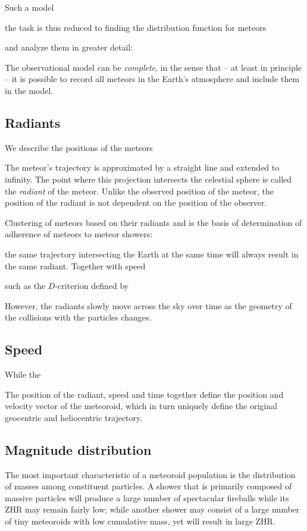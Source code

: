     Such a model 

    the task is thus reduced to finding the distribution function for meteors

    and analyze them in greater detail:

    The observational model can be \emph{complete}, in the sense that -- at least in principle -- it
    is possible to record all meteors in the Earth's atmosphere and include them in the model.

    \subsection{Radiants} \label{msr}        
        We describe the positions of the meteors

        The meteor's trajectory is approximated by a straight line and extended to infinity.
        The point where this projection intersects the celestial sphere is called the \emph{radiant} of the meteor.
        Unlike the observed position of the meteor, the position of the radiant is not dependent on
        the position of the observer.

        Clustering of meteors based on their radiants and is the basis of determination of
        adherence of meteors to meteor showers:

        the same trajectory intersecting the Earth at the same time will always result
        in the same radiant. Together with speed 

        such as the $D$-criterion defined by \citep{southworth+1964}

        However, the radiants slowly move across the sky over time as the geometry of the collisions
        with the particles changes.

    \subsection{Speed} \label{mss}
        While the 

        The position of the radiant, speed and time together define the position and velocity vector of the meteoroid,
        which in turn uniquely define the original geocentric and heliocentric trajectory.

    \subsection{Magnitude distribution} \label{msm}
        The most important characteristic of a meteoroid population is the distribution of masses
        among constituent particles. A shower that is primarily composed of massive particles
        will produce a large number of spectacular fireballs while its ZHR may remain fairly low;
        while another shower may consist of a large number of tiny meteoroids with low cumulative mass,
        yet will result in large ZHR.

